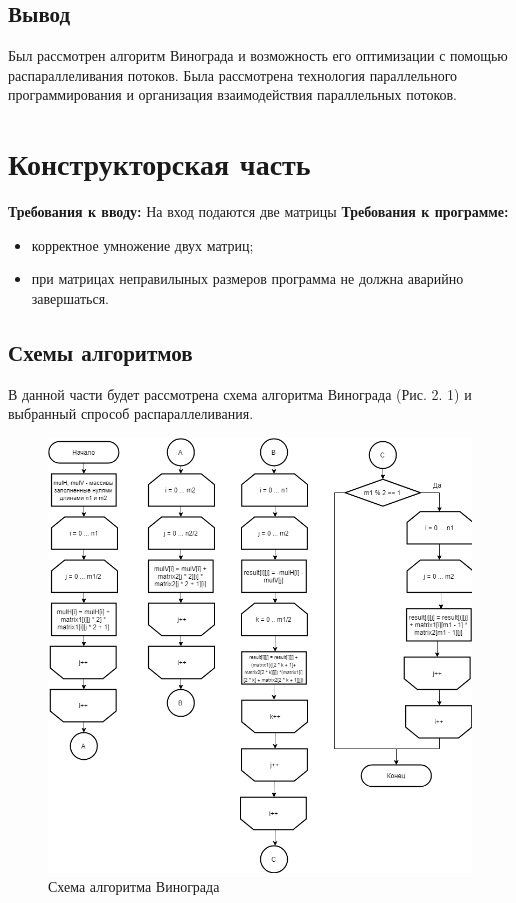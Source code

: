 \documentclass[12pt]{report}
\begin{document}
\section{Вывод}
Был рассмотрен алгоритм Винограда и возможность его оптимизации с помощью распараллеливания потоков. Была рассмотрена технология параллельного программирования и
организация взаимодействия параллельных потоков.



\chapter{Конструкторская часть}
\textbf{Требования к вводу:}
На вход подаются две матрицы
\newline
\textbf{Требования к программе:}
\begin{itemize}
\item корректное умножение двух матриц;
\item при матрицах неправилыных размеров программа не должна аварийно завершаться.
\end{itemize}

\section{Схемы алгоритмов}
В данной части будет рассмотрена схема алгоритма Винограда (Рис. 2. 1) и выбранный спрособ распараллеливания.

\begin{figure}[!htbp]
\centering
\includegraphics[scale=0.6]{SchemeVin}
\caption{Схема алгоритма Винограда}
\label{fig:mpr}
\end{figure}
\end{document}

